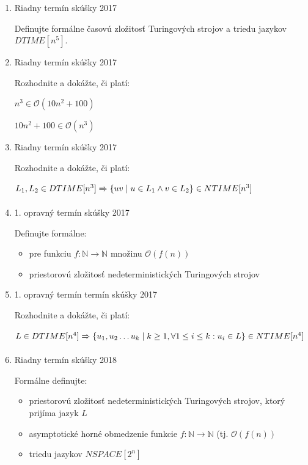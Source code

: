 \documentclass[]{article}
\begin{document}
	\begin{enumerate}
		\item Riadny termín skúšky 2017
		
		Definujte formálne časovú zložitosť Turingových strojov a triedu jazykov $DTIME[n^5]$.
		
		\item Riadny termín skúšky 2017
		
		Rozhodnite a dokážte, či platí:
		
		$n^3 \in \mathcal{O}(10n^2 + 100)$
		
		$10n^2 + 100 \in \mathcal{O}(n^3)$
		
		\item Riadny termín skúšky 2017
		
		Rozhodnite a dokážte, či platí:
		
		$L_1, L_2 \in DTIME[n^3] \xRightarrow[]{} \{ uv \mid u \in  L_1 \land v \in L_2\} \in NTIME[n^3]$
		
		\item 1. opravný termín skúšky 2017
		
		Definujte formálne:
		
		\begin{itemize}
			\item pre funkciu $f: \mathbb{N} \rightarrow \mathbb{N}$ množinu $\mathcal{O}(f(n))$
			\item priestorovú zložitosť nedeterministických Turingových strojov
		\end{itemize}
	
		\item 1. opravný termín termín skúšky 2017
		
		Rozhodnite a dokážte, či platí:
		
		$L \in DTIME[n^4] \xRightarrow[]{} \{ u_1, u_2 \ldots u_k \mid k \geq 1, \forall 1 \leq i \leq k: u_i \in L\} \in NTIME[n^4]$
		
		\item Riadny termín skúšky 2018
		
		Formálne definujte:
		
		\begin{itemize}
			\item priestorovú zložitosť nedeterministických Turingových strojov, ktorý prijíma jazyk $L$
			\item asymptotické horné obmedzenie funkcie $f: \mathbb{N} \rightarrow \mathbb{N}$ (tj. $\mathcal{O}(f(n))$
			\item triedu jazykov $NSPACE[2^n]$
		\end{itemize}
	\end{enumerate}
\end{document}
